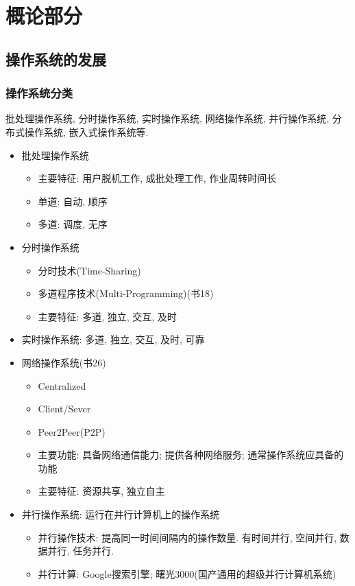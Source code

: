 \documentclass[a4paper, UTF8]{article}
\begin{document}
\section{概论部分}

\subsection{操作系统的发展}
\subsubsection{操作系统分类}
批处理操作系统, 分时操作系统, 实时操作系统, 网络操作系统, 并行操作系统, 分布式操作系统, 嵌入式操作系统等.
\begin{itemize}
\item 批处理操作系统
	\begin{itemize}
	\item 主要特征: 用户脱机工作, 成批处理工作, 作业周转时间长
	\item 单道: 自动, 顺序
	\item 多道: 调度, 无序
	\end{itemize}
\item 分时操作系统
	\begin{itemize}
	\item 分时技术(Time-Sharing)
	\item 多道程序技术(Multi-Programming)(书18)
	\item 主要特征: 多道, 独立, 交互, 及时
	\end{itemize}
\item 实时操作系统: 多道, 独立, 交互, 及时, 可靠
\item 网络操作系统(书26)
	\begin{itemize}
	\item Centralized
	\item Client/Sever
	\item Peer2Peer(P2P)
	\item 主要功能: 具备网络通信能力; 提供各种网络服务; 通常操作系统应具备的功能
	\item 主要特征: 资源共享, 独立自主
	\end{itemize}
\item 并行操作系统: 运行在并行计算机上的操作系统
	\begin{itemize}
	\item 并行操作技术: 提高同一时间间隔内的操作数量. 有时间并行, 空间并行, 数据并行, 任务并行.
	\item 并行计算: Google搜索引擎; 曙光3000(国产通用的超级并行计算机系统)
	\end{itemize}

\end{itemize}
\end{document}
